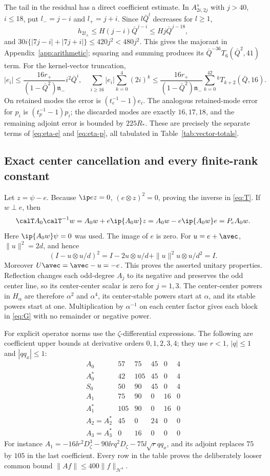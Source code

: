 The tail in the residual has a direct coefficient estimate. In
$A^s_{2i,2j}$ with $j>40$, $i\le18$, put $l_-=j-i$ and $l_+=j+i$.
Since $l\bar Q^l$ decreases for $l\ge1$,
\[
 h_{2l_\pm}\le H(j-i)\bar Q^{j-i}
 \le Hj\bar Q^{j-18},
\]
and $30i\{|7j-i|+|7j+i|\}\le420j^2<480j^2$.
This gives the majorant in Appendix~\ref{app:arithmetic}; squaring and
summing produces its $\bar Q^{-36}T_6(\bar Q^2,41)$ term.
For the kernel-vector truncation,
\[
 |e_i|\le\frac{16r_+}{(1-\bar Q^2)\mathfrak n_-}i^2\bar Q^i,
 \quad
 \sum_{i\ge16}|e_i|\sum_{k=0}^4(2i)^k
 \le\frac{16r_+}{(1-\bar Q^2)\mathfrak n_-}
       \sum_{k=0}^42^kT_{k+2}(\bar Q,16).
\]
On retained modes the error is $(t_e^{-1}-1)e_i$.
The analogous retained-mode error for $p_i$ is $(t_p^{-1}-1)p_i$;
the discarded modes are exactly $16,17,18$, and the remaining adjoint error
is bounded by $225R_*$. These are precisely the separate terms of
\eqref{eq:eta-e} and \eqref{eq:eta-p}, all tabulated in
Table~\ref{tab:vector-totals}.

\subsection{Exact center cancellation and every finite-rank constant}
Let $z=\psi-e$. Because $\ip e z=0$, $(e\otimes z)^2=0$, proving the
inverse in \eqref{eq:T}. If $w\perp e$, then
\[
 \calT A_0\calT^{-1}w=A_0w+e\ip{A_0w}z
 =A_0w-e\ip{A_0w}e=P_eA_0w.
\]
Here $\ip{A_0w}\psi=0$ was used. The image of $e$ is zero.
For $u=e+\avec$, $\|u\|^2=2d$, and hence
\[
 (I-u\otimes u/d)^2=I-2u\otimes u/d
                       +\|u\|^2u\otimes u/d^2=I.
\]
Moreover $U\avec=\avec-u=-e$. This proves the asserted unitary properties.
Reflection changes each odd-degree $A_j$ to its negative and preserves the
odd center line, so its center-center scalar is zero for $j=1,3$.
The center-center powers in $H_\alpha$ are therefore $\alpha^2$ and
$\alpha^4$, its center-stable powers start at $\alpha$, and its stable
powers start at one. Multiplication by $\alpha^{-1}$ on each center factor
gives each block in \eqref{eq:G} with no remainder or negative power.

For explicit operator norms use the $\zeta$-differential expressions. The
following are coefficient upper bounds at derivative orders $0,1,2,3,4$;
they use $r<1$, $|q|\le1$ and $|qq_x|\le1$:
\[
\begin{array}{c|rrrrr}
 A_0&57&75&45&0&4\\
 A_0^*&42&105&45&0&4\\
 S_0&50&90&45&0&4\\
 A_1&75&90&0&16&0\\
 A_1^*&105&90&0&16&0\\
 A_2=A_2^*&45&0&24&0&0\\
 A_3=A_3^*&0&16&0&0&0
\end{array}
\]
For instance $A_1=-16\ii r^2D_\zeta^3-90\ii r q^2D_\zeta
-75\ii\sqrt r qq_x$, and its adjoint replaces $75$ by $105$ in
the last coefficient. Every row in the table proves the deliberately
looser common bound $\|Af\|\le400\|f\|_{\mathcal H^4}$.

